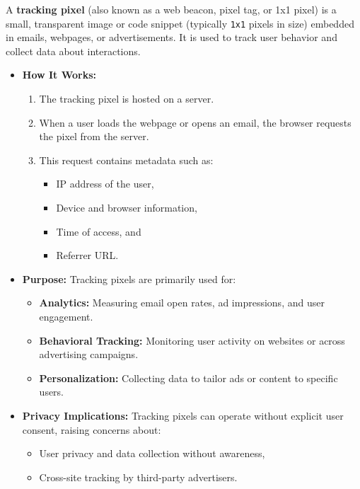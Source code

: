 \newpage 
\begin{Def}

    \label{def:tracking_pixels}
    A \textbf{tracking pixel} (also known as a web beacon, pixel tag, or 1x1 pixel) is a small, transparent image or code snippet (typically \texttt{1x1} pixels in size) embedded in emails, webpages, or advertisements. It is used to track user behavior and collect data about interactions.
    
    \begin{itemize}
        \item \textbf{How It Works:}
        \begin{enumerate}
            \item The tracking pixel is hosted on a server.
            \item When a user loads the webpage or opens an email, the browser requests the pixel from the server.
            \item This request contains metadata such as:
            \begin{itemize}
                \item IP address of the user,
                \item Device and browser information,
                \item Time of access, and
                \item Referrer URL.
            \end{itemize}
        \end{enumerate}
    
        \item \textbf{Purpose:} Tracking pixels are primarily used for:
        \begin{itemize}
            \item \textbf{Analytics:} Measuring email open rates, ad impressions, and user engagement.
            \item \textbf{Behavioral Tracking:} Monitoring user activity on websites or across advertising campaigns.
            \item \textbf{Personalization:} Collecting data to tailor ads or content to specific users.
        \end{itemize}
    
        \item \textbf{Privacy Implications:}  
        Tracking pixels can operate without explicit user consent, raising concerns about:
        \begin{itemize}
            \item User privacy and data collection without awareness,
            \item Cross-site tracking by third-party advertisers.
        \end{itemize}
    \end{itemize}
\end{Def}

